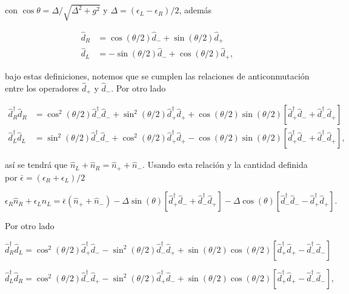 \begin{appendixs}
con $\cos \theta = \Delta/\sqrt{ \Delta^{2} + g^{2} }$ y $\Delta = (\epsilon_{L} - \epsilon_{R})/2$, además  

\begin{align*}
    \hat{d}_{R} & = \cos(\theta/2)\hat{d}_{-} + \sin(\theta/2)\hat{d}_{+} \\
    \hat{d}_{L} & = -\sin(\theta/2)\hat{d}_{-} + \cos(\theta/2)\hat{d}_{+},
\end{align*}

bajo estas definiciones, notemos que se cumplen las relaciones de anticonmutación entre los operadores $\hat{d}_{+}$ y $\hat{d}_{-}$. Por otro lado

\begin{align*}
    \hat{d}^{\dagger}_{R}\hat{d}_{R} & = \cos^{2}(\theta/2) \hat{d}^{\dagger}_{-}\hat{d}_{-} + \sin^{2}(\theta/2) \hat{d}^{\dagger}_{+}\hat{d}_{+} + \cos(\theta/2)\sin(\theta/2)[\hat{d}^{\dagger}_{+}\hat{d}_{-} + \hat{d}^{\dagger}_{-}\hat{d}_{+} ] \\
    \hat{d}^{\dagger}_{L}\hat{d}_{L} & = \sin^{2}(\theta/2) \hat{d}^{\dagger}_{-}\hat{d}_{-} + \cos^{2}(\theta/2) \hat{d}^{\dagger}_{+}\hat{d}_{+} - \cos(\theta/2)\sin(\theta/2)[\hat{d}^{\dagger}_{+}\hat{d}_{-} + \hat{d}^{\dagger}_{-}\hat{d}_{+} ],
\end{align*}

así se tendrá que $\hat{n}_{L} + \hat{n}_{R} = \hat{n}_{+} + \hat{n}_{-}$. Usando esta relación y la cantidad definida por $\bar{\epsilon} = (\epsilon_{R} + \epsilon_{L})/2$ 

\begin{equation}
    \epsilon_{R} \hat{n}_{R} + \epsilon_{L} \hat{n}_{L}  = \bar{\epsilon}( \hat{n}_{+} + \hat{n}_{-} ) - \Delta \sin(\theta) [\hat{d}^{\dagger}_{+}\hat{d}_{-} + \hat{d}^{\dagger}_{-}\hat{d}_{+}] - \Delta \cos(\theta) [\hat{d}^{\dagger}_{-}\hat{d}_{-} - \hat{d}^{\dagger}_{+}\hat{d}_{+}].
\label{apendix5:ec1}
\end{equation}

Por otro lado 

\begin{equation}
    \hat{d}^{\dagger}_{R}\hat{d}_{L} = \cos^{2}(\theta/2)\hat{d}^{\dagger}_{+}\hat{d}_{-} - \sin^{2}(\theta/2) \hat{d}^{\dagger}_{-}\hat{d}_{+}  + \sin(\theta/2)\cos(\theta/2)[ \hat{d}^{\dagger}_{+}\hat{d}_{+} - \hat{d}^{\dagger}_{-}\hat{d}_{-} ]
    \label{apendix5:ec2}
\end{equation}

\begin{equation}
    \hat{d}^{\dagger}_{L}\hat{d}_{R} = \cos^{2}(\theta/2)\hat{d}^{\dagger}_{-}\hat{d}_{+} - \sin^{2}(\theta/2) \hat{d}^{\dagger}_{+}\hat{d}_{-}  + \sin(\theta/2)\cos(\theta/2)[ \hat{d}^{\dagger}_{+}\hat{d}_{+} - \hat{d}^{\dagger}_{-}\hat{d}_{-} ],
    \label{apendix5:ec3}
\end{equation}


\end{appendixs}
